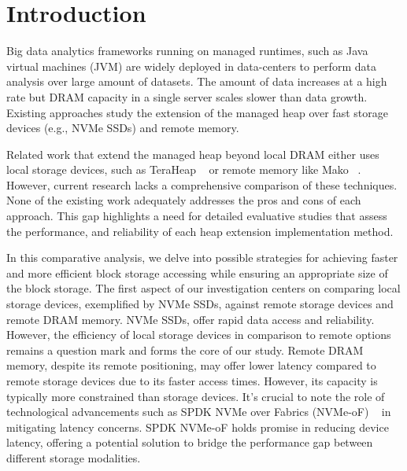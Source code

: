 \section{Introduction}
Big data analytics frameworks running on managed runtimes, such as Java virtual
machines (JVM) are widely deployed in data-centers to perform data analysis over
large amount of datasets. The amount of data increases at a high rate but DRAM
capacity in a single server scales slower than data growth. Existing approaches
study the extension of the managed heap over fast storage devices (e.g., NVMe
SSDs) and remote memory.


Related work that extend the managed heap beyond local DRAM either uses local storage devices, such as TeraHeap ~\cite{teraheap} or remote memory like Mako ~\cite{mako}. However, current
research lacks a comprehensive comparison of these techniques. None of the
existing work adequately addresses the pros and cons of each approach. This gap highlights a need
for detailed evaluative studies that assess the performance, and reliability of
each heap extension implementation method.



In this comparative analysis, we delve into possible strategies for achieving
faster and more efficient block storage accessing while ensuring an appropriate
size of the block storage. The first aspect of our investigation centers on
comparing local storage devices, exemplified by NVMe SSDs, against remote
storage devices and remote DRAM memory. NVMe SSDs, offer rapid data access and
reliability. However, the efficiency of local storage devices in comparison to
remote options remains a question mark and forms the core of our study. Remote
DRAM memory, despite its remote positioning, may offer lower latency compared to
remote storage devices due to its faster access times. However, its capacity is
typically more constrained than storage devices. It's crucial to note the role
of technological advancements such as SPDK NVMe over Fabrics (NVMe-oF) ~\cite{spdk} in
mitigating latency concerns. SPDK NVMe-oF holds promise in reducing device
latency, offering a potential solution to bridge the performance gap between
different storage modalities. 

